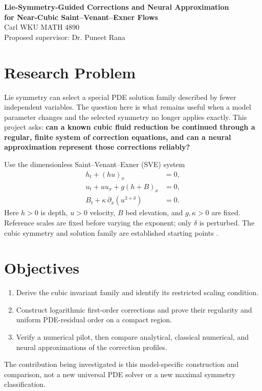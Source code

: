 \documentclass[12pt,a4paper]{article}
\begin{document}
\begin{center}
\textbf{Lie-Symmetry-Guided Corrections and Neural Approximation\\
for Near-Cubic Saint--Venant--Exner Flows}\\
Carl \quad WKU MATH 4890\\
Proposed supervisor: Dr. Puneet Rana
\end{center}

\section{Research Problem}
Lie symmetry can select a special PDE solution family described by fewer independent variables. The question here is what remains useful when a model parameter changes and the selected symmetry no longer applies exactly. This project asks: \textbf{can a known cubic fluid reduction be continued through a regular, finite system of correction equations, and can a neural approximation represent those corrections reliably?}

Use the dimensionless Saint--Venant--Exner (SVE) system
\begin{equation}
\begin{aligned}
h_t+(hu)_x&=0,\\
u_t+uu_x+g(h+B)_x&=0,\\
B_t+\kappa\,\partial_x(u^{3+\delta})&=0.
\end{aligned}\label{eq:pde}
\end{equation}
Here $h>0$ is depth, $u>0$ velocity, $B$ bed elevation, and $g,\kappa>0$ are fixed. Reference scales are fixed before varying the exponent; only $\delta$ is perturbed. The cubic symmetry and solution family are established starting points \cite{sve}.

\section{Objectives}
\begin{enumerate}
\item Derive the cubic invariant family and identify its restricted scaling condition.
\item Construct logarithmic first-order corrections and prove their regularity and uniform PDE-residual order on a compact region.
\item Verify a numerical pilot, then compare analytical, classical numerical, and neural approximations of the correction profiles.
\end{enumerate}
The contribution being investigated is this model-specific construction and comparison, not a new universal PDE solver or a new maximal symmetry classification.
\end{document}
